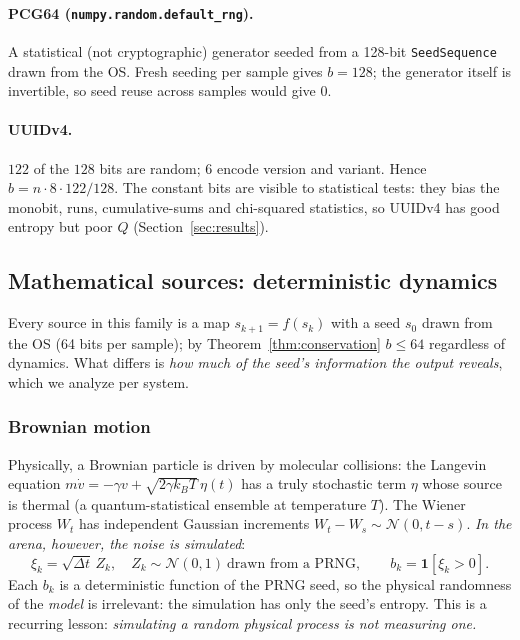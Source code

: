 \documentclass[11pt,a4paper]{article}
\theoremstyle{plain}
\theoremstyle{definition}
\begin{document}
\paragraph{PCG64 (\texttt{numpy.random.default\_rng}).} A statistical (not
cryptographic) generator seeded from a 128-bit \texttt{SeedSequence} drawn from
the OS. Fresh seeding per sample gives $b=128$; the generator itself is
invertible, so seed reuse across samples would give $0$.

\paragraph{UUIDv4.} $122$ of the $128$ bits are random; $6$ encode version and
variant. Hence $b=n\cdot 8\cdot 122/128$. The constant bits are visible to
statistical tests: they bias the monobit, runs, cumulative-sums and chi-squared
statistics, so UUIDv4 has good entropy but poor $Q$ (Section~\ref{sec:results}).

\subsection{Mathematical sources: deterministic dynamics}

Every source in this family is a map $s_{k+1}=f(s_k)$ with a seed $s_0$ drawn
from the OS (64 bits per sample); by Theorem~\ref{thm:conservation}
$b\le 64$ regardless of dynamics. What differs is \emph{how much of the seed's
information the output reveals}, which we analyze per system.

\subsubsection{Brownian motion}

Physically, a Brownian particle is driven by molecular collisions:
the Langevin equation $m\dot v=-\gamma v+\sqrt{2\gamma k_BT}\,\eta(t)$ has a
truly stochastic term $\eta$ whose source is thermal (a quantum-statistical
ensemble at temperature $T$). The Wiener process $W_t$ has independent Gaussian
increments $W_t-W_s\sim\mathcal{N}(0,t-s)$. \emph{In the arena, however, the
noise is simulated}:
\begin{equation}
    \xi_k=\sqrt{\Delta t}\,Z_k,\quad Z_k\sim\mathcal{N}(0,1)\ \text{drawn from a PRNG},\qquad
    b_k=\mathbf{1}[\xi_k>0].
\end{equation}
Each $b_k$ is a deterministic function of the PRNG seed, so the physical
randomness of the \emph{model} is irrelevant: the simulation has only the seed's
entropy. This is a recurring lesson: \emph{simulating a random physical process
is not measuring one.}
\end{document}
